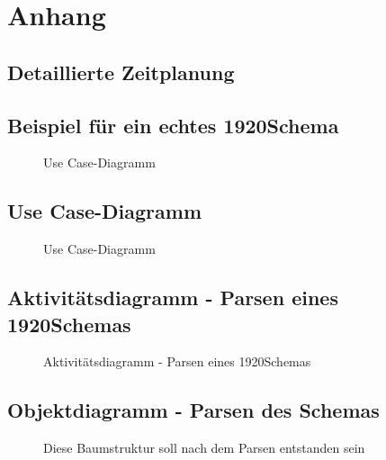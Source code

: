 \section{Anhang}
\subsection{Detaillierte Zeitplanung}
\label{app:Zeitplanung}


\clearpage
\subsection{Beispiel für ein echtes 1920Schema}
\label{app:RealSchema}
\begin{figure}[htb]
\centering
{}
\caption{Use Case-Diagramm}
\end{figure}

\clearpage


\subsection{Use Case-Diagramm}
\label{app:UseCase}
\begin{figure}[htb]
\centering
{}
\caption{Use Case-Diagramm}
\end{figure}
\clearpage


\clearpage

\subsection{Aktivitätsdiagramm - Parsen eines 1920Schemas}
\label{app:AktivitaetsdiagrammSchemaParsen}
\begin{figure}[htb]
\centering
{}
\caption{Aktivitätsdiagramm - Parsen eines 1920Schemas}
\end{figure}
\clearpage


\subsection{Objektdiagramm - Parsen des Schemas}
\label{app:ObjDiagramsdiagrammSchemaParsen}
\begin{figure}[htb]
\centering
{}
\caption{Diese Baumstruktur soll nach dem Parsen entstanden sein}
\end{figure}
\clearpage




